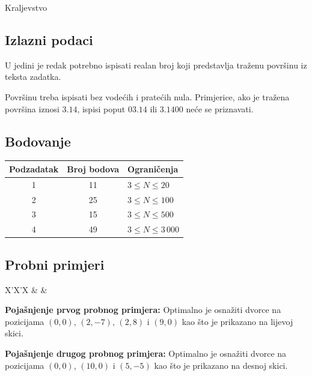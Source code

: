 \begin{statement}[
  problempoints=100,
  timelimit=1 sekunda,
  memorylimit=512 MiB,
]{Kraljevstvo}
\subsection*{Izlazni podaci}
U jedini je redak potrebno ispisati realan broj koji predstavlja traženu
površinu iz teksta zadatka.

Površinu treba ispisati bez vodećih i pratećih nula. Primjerice, ako je
tražena površina iznosi $3.14$, ispisi poput $03.14$ ili $3.1400$ neće
se priznavati.

\subsection*{Bodovanje}
{\renewcommand{\arraystretch}{1.4}
  \setlength{\tabcolsep}{6pt}
  \begin{tabular}{ccl}
 Podzadatak & Broj bodova & Ograničenja \\ \midrule
  1 & 11 & $3 \le N \le 20$ \\
  2 & 25 & $3 \le N \le 100$ \\
  3 & 15 & $3 \le N \le 500$ \\
  4 & 49 & $3 \le N \le 3\,000$ \\
\end{tabular}}

\subsection*{Probni primjeri}
\begin{tabularx}{\textwidth}{X'X'X}
 &
 &
\end{tabularx}

\textbf{Pojašnjenje prvog probnog primjera:}
Optimalno je osnažiti dvorce na pozicijama $(0,0)$, $(2, -7)$, $(2, 8)$ i $(9, 0)$
kao što je prikazano na lijevoj skici.

\textbf{Pojašnjenje drugog probnog primjera:}
Optimalno je osnažiti dvorce na pozicijama $(0,0)$, $(10, 0)$ i $(5, -5)$
kao što je prikazano na desnoj skici.


\end{statement}
